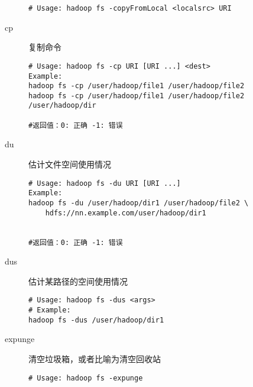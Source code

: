 \documentclass{article}
\begin{document}
\begin{description}
\begin{verbatim}
# Usage: hadoop fs -copyFromLocal <localsrc> URI
\end{verbatim}

\item[cp] 复制命令

\begin{verbatim}
# Usage: hadoop fs -cp URI [URI ...] <dest>
Example: 
hadoop fs -cp /user/hadoop/file1 /user/hadoop/file2
hadoop fs -cp /user/hadoop/file1 /user/hadoop/file2 /user/hadoop/dir

#返回值：0: 正确 -1: 错误
\end{verbatim}

\item[du] 估计文件空间使用情况

\begin{verbatim}
# Usage: hadoop fs -du URI [URI ...]
Example: 
hadoop fs -du /user/hadoop/dir1 /user/hadoop/file2 \
	hdfs://nn.example.com/user/hadoop/dir1


#返回值：0: 正确 -1: 错误
\end{verbatim}

\item[dus] 估计某路径的空间使用情况

\begin{verbatim}
# Usage: hadoop fs -dus <args>
# Example: 
hadoop fs -dus /user/hadoop/dir1 
\end{verbatim}

\item[expunge] 清空垃圾箱，或者比喻为清空回收站

\begin{verbatim}
# Usage: hadoop fs -expunge
\end{verbatim}


\end{description}
\end{document}
